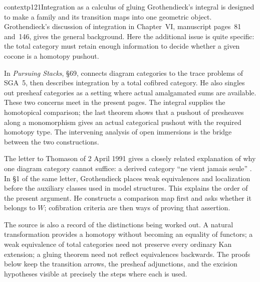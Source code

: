\begin{dcomment}{context}{p121}{Integration as a calculus of gluing}
Grothendieck's integral is designed to make a family and its transition maps into one geometric object. Grothendieck's discussion of integration in Chapter~VI, manuscript pages~81 and~146, gives the general background. Here the additional issue is quite specific: the total category must retain enough information to decide whether a given cocone is a homotopy pushout.

In \emph{Pursuing Stacks}, \S69, \citet{Grothendieck1983} connects diagram categories to the trace problems of SGA~5, then describes integration by a total cofibred category. He also singles out presheaf categories as a setting where actual amalgamated sums are available. These two concerns meet in the present pages. The integral supplies the homotopical comparison; the last theorem shows that a pushout of presheaves along a monomorphism gives an actual categorical pushout with the required homotopy type. The intervening analysis of open immersions is the bridge between the two constructions.

The letter to Thomason of 2 April 1991 gives a closely related explanation of why one diagram category cannot suffice: a derived category ``ne vient jamais seule'' \citep[\S2]{Grothendieck1991Letter}. In \S1 of the same letter, Grothendieck places weak equivalences and localization before the auxiliary classes used in model structures. This explains the order of the present argument. He constructs a comparison map first and asks whether it belongs to $W$; cofibration criteria are then ways of proving that assertion.

The source is also a record of the distinctions being worked out. A natural transformation provides a homotopy without becoming an equality of functors; a weak equivalence of total categories need not preserve every ordinary Kan extension; a gluing theorem need not reflect equivalences backwards. The proofs below keep the transition arrows, the presheaf adjunctions, and the excision hypotheses visible at precisely the steps where each is used.
\end{dcomment}

